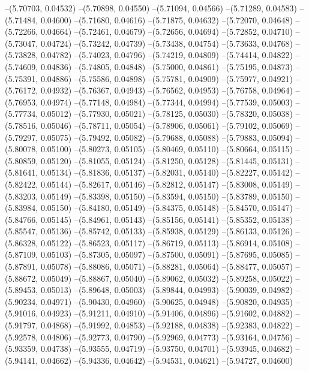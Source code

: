 --(5.70703, 0.04532)
--(5.70898, 0.04550)
--(5.71094, 0.04566)
--(5.71289, 0.04583)
--(5.71484, 0.04600)
--(5.71680, 0.04616)
--(5.71875, 0.04632)
--(5.72070, 0.04648)
--(5.72266, 0.04664)
--(5.72461, 0.04679)
--(5.72656, 0.04694)
--(5.72852, 0.04710)
--(5.73047, 0.04724)
--(5.73242, 0.04739)
--(5.73438, 0.04754)
--(5.73633, 0.04768)
--(5.73828, 0.04782)
--(5.74023, 0.04796)
--(5.74219, 0.04809)
--(5.74414, 0.04822)
--(5.74609, 0.04836)
--(5.74805, 0.04848)
--(5.75000, 0.04861)
--(5.75195, 0.04873)
--(5.75391, 0.04886)
--(5.75586, 0.04898)
--(5.75781, 0.04909)
--(5.75977, 0.04921)
--(5.76172, 0.04932)
--(5.76367, 0.04943)
--(5.76562, 0.04953)
--(5.76758, 0.04964)
--(5.76953, 0.04974)
--(5.77148, 0.04984)
--(5.77344, 0.04994)
--(5.77539, 0.05003)
--(5.77734, 0.05012)
--(5.77930, 0.05021)
--(5.78125, 0.05030)
--(5.78320, 0.05038)
--(5.78516, 0.05046)
--(5.78711, 0.05054)
--(5.78906, 0.05061)
--(5.79102, 0.05069)
--(5.79297, 0.05075)
--(5.79492, 0.05082)
--(5.79688, 0.05088)
--(5.79883, 0.05094)
--(5.80078, 0.05100)
--(5.80273, 0.05105)
--(5.80469, 0.05110)
--(5.80664, 0.05115)
--(5.80859, 0.05120)
--(5.81055, 0.05124)
--(5.81250, 0.05128)
--(5.81445, 0.05131)
--(5.81641, 0.05134)
--(5.81836, 0.05137)
--(5.82031, 0.05140)
--(5.82227, 0.05142)
--(5.82422, 0.05144)
--(5.82617, 0.05146)
--(5.82812, 0.05147)
--(5.83008, 0.05149)
--(5.83203, 0.05149)
--(5.83398, 0.05150)
--(5.83594, 0.05150)
--(5.83789, 0.05150)
--(5.83984, 0.05150)
--(5.84180, 0.05149)
--(5.84375, 0.05148)
--(5.84570, 0.05147)
--(5.84766, 0.05145)
--(5.84961, 0.05143)
--(5.85156, 0.05141)
--(5.85352, 0.05138)
--(5.85547, 0.05136)
--(5.85742, 0.05133)
--(5.85938, 0.05129)
--(5.86133, 0.05126)
--(5.86328, 0.05122)
--(5.86523, 0.05117)
--(5.86719, 0.05113)
--(5.86914, 0.05108)
--(5.87109, 0.05103)
--(5.87305, 0.05097)
--(5.87500, 0.05091)
--(5.87695, 0.05085)
--(5.87891, 0.05078)
--(5.88086, 0.05071)
--(5.88281, 0.05064)
--(5.88477, 0.05057)
--(5.88672, 0.05049)
--(5.88867, 0.05040)
--(5.89062, 0.05032)
--(5.89258, 0.05022)
--(5.89453, 0.05013)
--(5.89648, 0.05003)
--(5.89844, 0.04993)
--(5.90039, 0.04982)
--(5.90234, 0.04971)
--(5.90430, 0.04960)
--(5.90625, 0.04948)
--(5.90820, 0.04935)
--(5.91016, 0.04923)
--(5.91211, 0.04910)
--(5.91406, 0.04896)
--(5.91602, 0.04882)
--(5.91797, 0.04868)
--(5.91992, 0.04853)
--(5.92188, 0.04838)
--(5.92383, 0.04822)
--(5.92578, 0.04806)
--(5.92773, 0.04790)
--(5.92969, 0.04773)
--(5.93164, 0.04756)
--(5.93359, 0.04738)
--(5.93555, 0.04719)
--(5.93750, 0.04701)
--(5.93945, 0.04682)
--(5.94141, 0.04662)
--(5.94336, 0.04642)
--(5.94531, 0.04621)
--(5.94727, 0.04600)
